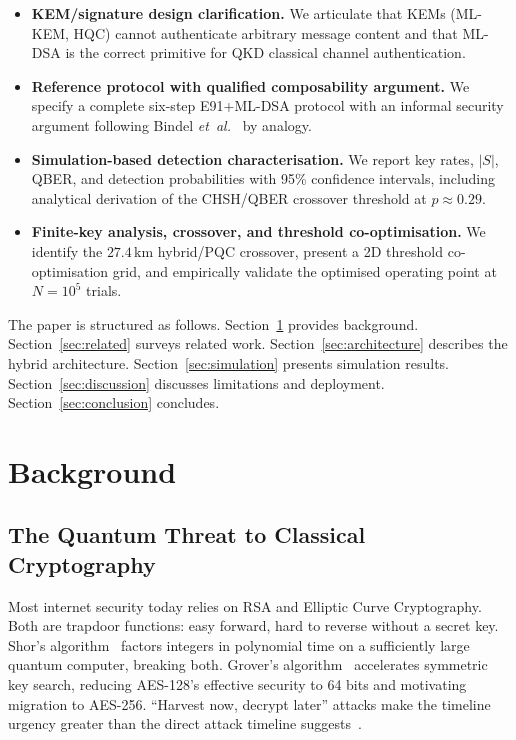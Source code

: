 \documentclass[conference]{IEEEtran}
\begin{document}
\begin{itemize}
\item \textbf{KEM/signature design clarification.} We articulate that KEMs (ML-KEM, HQC) cannot authenticate arbitrary message content and that ML-DSA is the correct primitive for QKD classical channel authentication.
\item \textbf{Reference protocol with qualified composability argument.} We specify a complete six-step E91+ML-DSA protocol with an informal security argument following Bindel \emph{et~al.}~\cite{bindel2019} by analogy.
\item \textbf{Simulation-based detection characterisation.} We report key rates, $|S|$, QBER, and detection probabilities with 95\% confidence intervals, including analytical derivation of the CHSH/QBER crossover threshold at $p \approx 0.29$.
\item \textbf{Finite-key analysis, crossover, and threshold co-optimisation.} We identify the $27.4$\,km hybrid/PQC crossover, present a 2D threshold co-optimisation grid, and empirically validate the optimised operating point at $N = 10^5$ trials.
\end{itemize}

The paper is structured as follows. Section~\ref{sec:background} provides background. Section~\ref{sec:related} surveys related work. Section~\ref{sec:architecture} describes the hybrid architecture. Section~\ref{sec:simulation} presents simulation results. Section~\ref{sec:discussion} discusses limitations and deployment. Section~\ref{sec:conclusion} concludes.

\section{Background}
\label{sec:background}

\subsection{The Quantum Threat to Classical Cryptography}
Most internet security today relies on RSA and Elliptic Curve Cryptography. Both are trapdoor functions: easy forward, hard to reverse without a secret key. Shor's algorithm~\cite{shor1997} factors integers in polynomial time on a sufficiently large quantum computer, breaking both. Grover's algorithm~\cite{grover1996} accelerates symmetric key search, reducing AES-128's effective security to 64 bits and motivating migration to AES-256. ``Harvest now, decrypt later'' attacks make the timeline urgency greater than the direct attack timeline suggests~\cite{mosca2018}.
\end{document}
